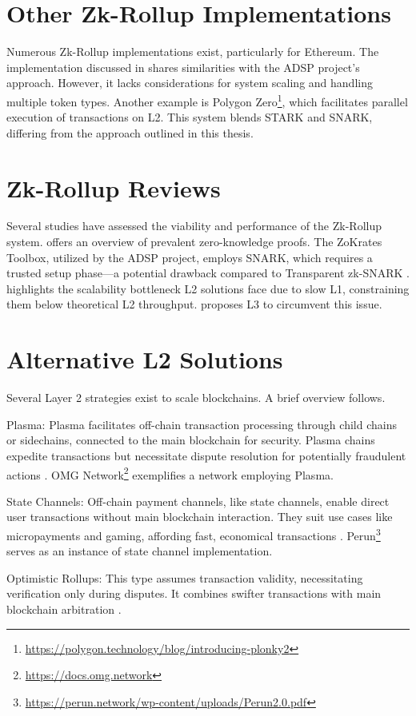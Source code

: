 \section{Other Zk-Rollup Implementations}
Numerous Zk-Rollup implementations exist, particularly for Ethereum. The implementation discussed in \cite{dinh_implementation_2023} shares similarities with the ADSP project's approach. However, it lacks considerations for system scaling and handling multiple token types. Another example is Polygon Zero\footnote{\url{https://polygon.technology/blog/introducing-plonky2}}, which facilitates parallel execution of transactions on L2. This system blends STARK and SNARK, differing from the approach outlined in this thesis.

\section{Zk-Rollup Reviews}
Several studies have assessed the viability and performance of the Zk-Rollup system. \cite{capko_state_2022} offers an overview of prevalent zero-knowledge proofs. The ZoKrates Toolbox, utilized by the ADSP project, employs SNARK, which requires a trusted setup phase—a potential drawback compared to Transparent zk-SNARK \cite{zhou_overview_2022}. \cite{neiheiser_practical_2023} highlights the scalability bottleneck L2 solutions face due to slow L1, constraining them below theoretical L2 throughput. \cite{starkware_fractal_2021} proposes L3 to circumvent this issue.

\section{Alternative L2 Solutions}
Several Layer 2 strategies exist to scale blockchains. A brief overview follows.

Plasma: Plasma facilitates off-chain transaction processing through child chains or sidechains, connected to the main blockchain for security. Plasma chains expedite transactions but necessitate dispute resolution for potentially fraudulent actions \cite{thibault_blockchain_2022}. OMG Network\footnote{\url{https://docs.omg.network}} exemplifies a network employing Plasma.

State Channels: Off-chain payment channels, like state channels, enable direct user transactions without main blockchain interaction. They suit use cases like micropayments and gaming, affording fast, economical transactions \cite{negka_blockchain_2021}. Perun\footnote{\url{https://perun.network/wp-content/uploads/Perun2.0.pdf}} serves as an instance of state channel implementation.

Optimistic Rollups: This type assumes transaction validity, necessitating verification only during disputes. It combines swifter transactions with main blockchain arbitration \cite{thibault_blockchain_2022}.
